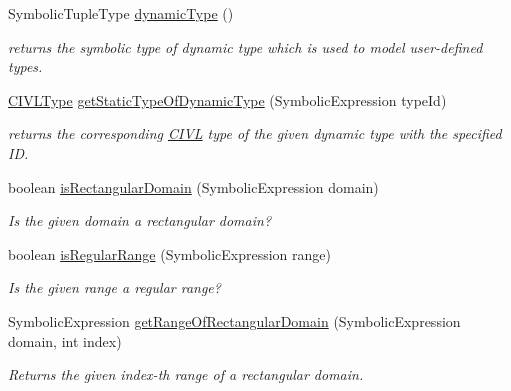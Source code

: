 \begin{DoxyCompactItemize}
Symbolic\+Tuple\+Type \hyperlink{classedu_1_1udel_1_1cis_1_1vsl_1_1civl_1_1dynamic_1_1common_1_1CommonSymbolicUtility_a819b317c8a752c847f4d5d8c0d585a1c}{dynamic\+Type} ()
\begin{DoxyCompactList}\small\item\em returns the symbolic type of dynamic type which is used to model user-\/defined types. \end{DoxyCompactList}\item 
\hyperlink{interfaceedu_1_1udel_1_1cis_1_1vsl_1_1civl_1_1model_1_1IF_1_1type_1_1CIVLType}{C\+I\+V\+L\+Type} \hyperlink{classedu_1_1udel_1_1cis_1_1vsl_1_1civl_1_1dynamic_1_1common_1_1CommonSymbolicUtility_a7c8218434fabf774f60f3f98e6efff6a}{get\+Static\+Type\+Of\+Dynamic\+Type} (Symbolic\+Expression type\+Id)
\begin{DoxyCompactList}\small\item\em returns the corresponding \hyperlink{classedu_1_1udel_1_1cis_1_1vsl_1_1civl_1_1CIVL}{C\+I\+V\+L} type of the given dynamic type with the specified I\+D. \end{DoxyCompactList}\item 
boolean \hyperlink{classedu_1_1udel_1_1cis_1_1vsl_1_1civl_1_1dynamic_1_1common_1_1CommonSymbolicUtility_a5dfc8f254568c6da40ba1a87d0653fcd}{is\+Rectangular\+Domain} (Symbolic\+Expression domain)
\begin{DoxyCompactList}\small\item\em Is the given domain a rectangular domain? \end{DoxyCompactList}\item 
boolean \hyperlink{classedu_1_1udel_1_1cis_1_1vsl_1_1civl_1_1dynamic_1_1common_1_1CommonSymbolicUtility_acd710887d5b28facfcb477e0a98afe1b}{is\+Regular\+Range} (Symbolic\+Expression range)
\begin{DoxyCompactList}\small\item\em Is the given range a regular range? \end{DoxyCompactList}\item 
Symbolic\+Expression \hyperlink{classedu_1_1udel_1_1cis_1_1vsl_1_1civl_1_1dynamic_1_1common_1_1CommonSymbolicUtility_aa5e32e2fd0e9f64aac908f467849b5cc}{get\+Range\+Of\+Rectangular\+Domain} (Symbolic\+Expression domain, int index)
\begin{DoxyCompactList}\small\item\em Returns the given index-\/th range of a rectangular domain. \end{DoxyCompactList}\item 

\end{DoxyCompactItemize}
